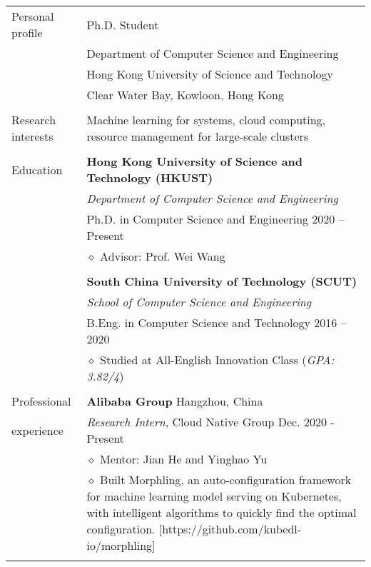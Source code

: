 \documentclass[letterpaper, 11pt]{article}
\begin{document}
\begin{longtable}{p{1.3in}p{4.8in}}

{Personal profile}
& Ph.D. Student \\
& Department of Computer Science and Engineering \\
& Hong Kong University of Science and Technology \\
& Clear Water Bay, Kowloon, Hong Kong \\
& \\

\nohyphens{Research interests}
& Machine learning for systems, cloud computing, resource management for large-scale clusters \\
& \\

{Education}
& \textbf{Hong Kong University of Science and Technology (HKUST)} \\
& \textit{Department of Computer Science and Engineering} \\
& Ph.D. in Computer Science and Engineering \hfill 2020 -- Present \\
& $\diamond$ Advisor: Prof. Wei Wang \\
& \\

& \textbf{South China University of Technology (SCUT)} \\
& \textit{School of Computer Science and Engineering} \\
& B.Eng. in Computer Science and Technology \hfill 2016 -- 2020 \\
& $\diamond$ Studied at All-English Innovation Class ({\it GPA: 3.82/4}) \\
& \\


{Professional}
& {\textbf{Alibaba Group}} \hfill Hangzhou, China \\
{experience}
& \textit{Research Intern}, Cloud Native Group \hfill Dec. 2020 - Present \\
& $\diamond$ Mentor: Jian He and Yinghao Yu \\
& $\diamond$ Built Morphling, an auto-configuration framework for machine learning model serving on Kubernetes, with intelligent algorithms to quickly find the optimal configuration. [https://github.com/kubedl-io/morphling] \\
& \\


\end{longtable}
\end{document}
